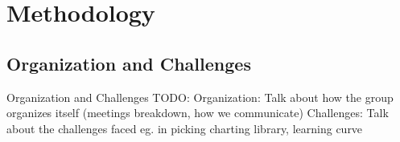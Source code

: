 \documentclass{beamer}
\begin{document}
\section{Methodology}

\subsection{Organization and Challenges}
\begin{frame}{Organization and Challenges}
TODO: 
Organization: Talk about how the group organizes itself (meetings breakdown, how we communicate)
\newline Challenges: Talk about the challenges faced eg. in picking charting library, learning curve 
\end{frame}
\end{document}
